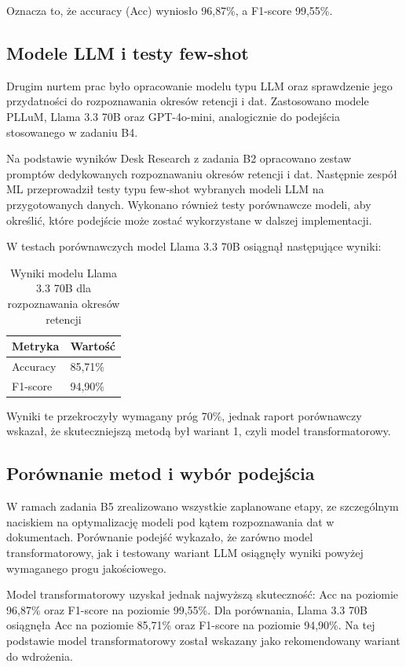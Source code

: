 \documentclass[12pt,a4paper]{report}
\begin{document}
Oznacza to, że accuracy (Acc) wyniosło 96{,}87\%, a F1-score 99{,}55\%.

\subsection{Modele LLM i testy few-shot}
Drugim nurtem prac było opracowanie modelu typu LLM oraz sprawdzenie jego przydatności do rozpoznawania okresów retencji i dat. Zastosowano modele PLLuM, Llama 3.3 70B oraz GPT-4o-mini, analogicznie do podejścia stosowanego w zadaniu B4.

Na podstawie wyników Desk Research z zadania B2 opracowano zestaw promptów dedykowanych rozpoznawaniu okresów retencji i dat. Następnie zespół ML przeprowadził testy typu few-shot wybranych modeli LLM na przygotowanych danych. Wykonano również testy porównawcze modeli, aby określić, które podejście może zostać wykorzystane w dalszej implementacji.

W testach porównawczych model Llama 3.3 70B osiągnął następujące wyniki:

\begin{table}[h]
    \centering
    \caption{Wyniki modelu Llama 3.3 70B dla rozpoznawania okresów retencji}
    \begin{tabular}{l l}
        \toprule
        Metryka & Wartość \\
        \midrule
        Accuracy & 85{,}71\% \\
        F1-score & 94{,}90\% \\
        \bottomrule
    \end{tabular}
\end{table}

Wyniki te przekroczyły wymagany próg 70\%, jednak raport porównawczy wskazał, że skuteczniejszą metodą był wariant 1, czyli model transformatorowy.

\subsection{Porównanie metod i wybór podejścia}
W ramach zadania B5 zrealizowano wszystkie zaplanowane etapy, ze szczególnym naciskiem na optymalizację modeli pod kątem rozpoznawania dat w dokumentach. Porównanie podejść wykazało, że zarówno model transformatorowy, jak i testowany wariant LLM osiągnęły wyniki powyżej wymaganego progu jakościowego.

Model transformatorowy uzyskał jednak najwyższą skuteczność: Acc na poziomie 96{,}87\% oraz F1-score na poziomie 99{,}55\%. Dla porównania, Llama 3.3 70B osiągnęła Acc na poziomie 85{,}71\% oraz F1-score na poziomie 94{,}90\%. Na tej podstawie model transformatorowy został wskazany jako rekomendowany wariant do wdrożenia.
\end{document}
